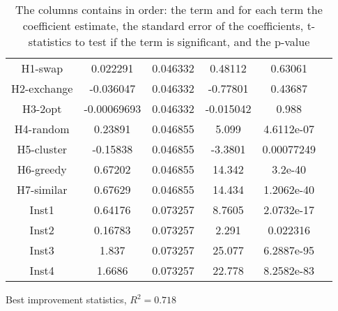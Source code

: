 \documentclass[../main.tex]{subfiles}
\begin{document}
\begin{table}
\begin{adjustbox}{width=\columnwidth,center}
\begin{subtable}{.75\columnwidth}
\begin{tabular}{cccccc}
            H1-swap      & 0.022291  & 0.046332      & 0.48112   & 0.63061   \\
            H2-exchange      & -0.036047 & 0.046332      & -0.77801  & 0.43687   \\
            H3-2opt      &-0.00069693& 0.046332      & -0.015042 & 0.988     \\
            H4-random      & 0.23891   & 0.046855      & 5.099     & 4.6112e-07\\
            H5-cluster      & -0.15838  & 0.046855      & -3.3801   & 0.00077249\\
            H6-greedy      & 0.67202   & 0.046855      & 14.342    & 3.2e-40   \\
            H7-similar      & 0.67629   & 0.046855      & 14.434    & 1.2062e-40\\
            Inst1   & 0.64176   & 0.073257      & 8.7605    & 2.0732e-17\\
            Inst2   & 0.16783   & 0.073257      & 2.291     & 0.022316  \\
            Inst3   & 1.837     & 0.073257      & 25.077    & 6.2887e-95\\
            Inst4   & 1.6686    & 0.073257      & 22.778    & 8.2582e-83\\
            \hline
            \end{tabular}
        \caption{Best improvement statistics, $R^2=0.718$}
        \label{tab:regrBestNormal}
        \end{subtable}
    \end{adjustbox}
    \label{tab:regrNormal}
    \caption*{The columns contains in order: the term and for each term the coefficient estimate, the standard error of the coefficients, t-statistics to test if the term is significant, and the p-value}
\end{table}
\end{document}
